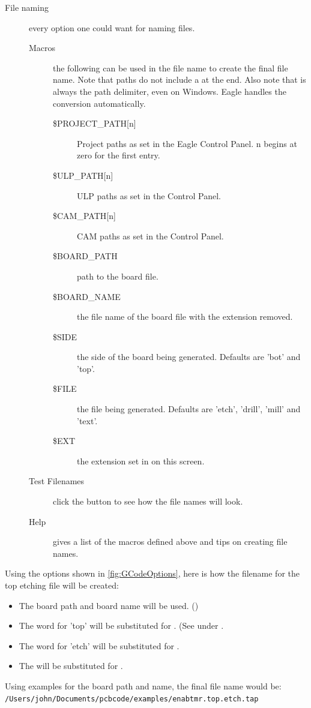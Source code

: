 \documentclass[11pt]{book}
\begin{document}
\begin{description}
	\item[File naming] every option one could want for naming files.
	\begin{description}
		\item[Macros] the following can be used in the file name to create the final file name. Note that paths do not include a \code{/} at the end. Also note that \code{/} is always the path delimiter, even on Windows. Eagle handles the conversion automatically.
		\begin{description}
			\item[\$PROJECT\_{}PATH{[}n{]}] Project paths as set in the Eagle Control Panel. n begins at zero for the first entry.
			\item[\$ULP\_{}PATH{[}n{]}] ULP paths as set in the Control Panel.
			\item[\$CAM\_{}PATH{[}n{]}] CAM paths as set in the Control Panel.
			\item[\$BOARD\_{}PATH] path to the board file.
			\item[\$BOARD\_{}NAME] the file name of the board file with the extension removed.
			\item[\$SIDE] the side of the board being generated. Defaults are 'bot' and 'top'.
			\item[\$FILE] the file being generated. Defaults are 'etch', 'drill', 'mill' and 'text'.
			\item[\$EXT] the extension set in  on this screen.
		\end{description}
		\item[Test Filenames] click the button to see how the file names will look.
		\item[Help] gives a list of the macros defined above and tips on creating file names.
	\end{description}
\end{description}

Using the options shown in \ref{fig:GCodeOptions}, here is how the filename for the top etching file will be created:
\begin{itemize}
\item The board path and board name will be used. ()
\item The word for 'top' will be substituted for . (See  under .
\item The word for 'etch' will be substituted for .
\item The  will be substituted for .
\end{itemize}
Using examples for the board path and name, the final file name would be:\\
\lstinline!/Users/john/Documents/pcbcode/examples/enabtmr.top.etch.tap!
\end{document}
